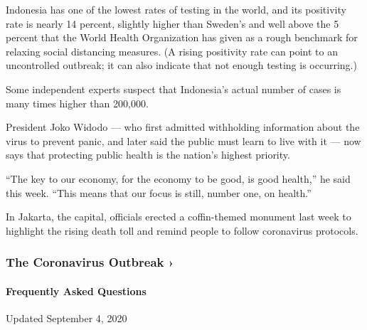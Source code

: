 Indonesia has one of the lowest rates of testing in the world, and its
positivity rate is nearly 14 percent, slightly higher than Sweden's and
well above the 5 percent that the World Health Organization has given as
a rough benchmark for relaxing social distancing measures. (A rising
positivity rate can point to an uncontrolled outbreak; it can also
indicate that not enough testing is occurring.)

Some independent experts suspect that Indonesia's actual number of cases
is many times higher than 200,000.

President Joko Widodo --- who first admitted withholding information
about the virus to prevent panic, and later said the public must learn
to live with it --- now says that protecting public health is the
nation's highest priority.

``The key to our economy, for the economy to be good, is good health,''
he said this week. ``This means that our focus is still, number one, on
health.''

In Jakarta, the capital, officials erected a coffin-themed monument last
week to highlight the rising death toll and remind people to follow
coronavirus protocols.

\href{https://www.nytimes3xbfgragh.onion/news-event/coronavirus?action=click\&pgtype=Article\&state=default\&region=MAIN_CONTENT_3\&context=storylines_faq}{}

\hypertarget{the-coronavirus-outbreak-}{%
\subsubsection{The Coronavirus Outbreak
›}\label{the-coronavirus-outbreak-}}

\hypertarget{frequently-asked-questions}{%
\paragraph{Frequently Asked
Questions}\label{frequently-asked-questions}}

Updated September 4, 2020

